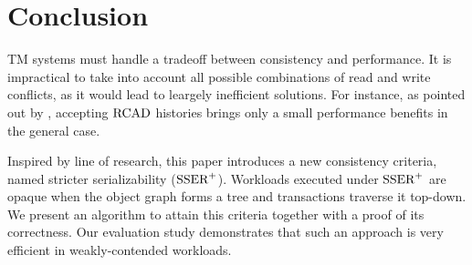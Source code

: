 \section{Conclusion}

TM systems must handle a tradeoff between consistency and performance.
It is impractical to take into account all possible combinations of read and write conflicts, as it would lead to leargely inefficient solutions.
For instance, as pointed out by \citet{hans16}, accepting $\RCAD$ histories brings only a small performance benefits in the general case.

Inspired by line of research, this paper introduces a new consistency criteria, named stricter serializability ($\SPSER$).
Workloads executed under $\SPSER$ are opaque when the object graph forms a tree and transactions traverse it top-down.
We present an algorithm to attain this criteria together with a proof of its correctness.
Our evaluation study demonstrates that such an approach is very efficient in weakly-contended workloads.

